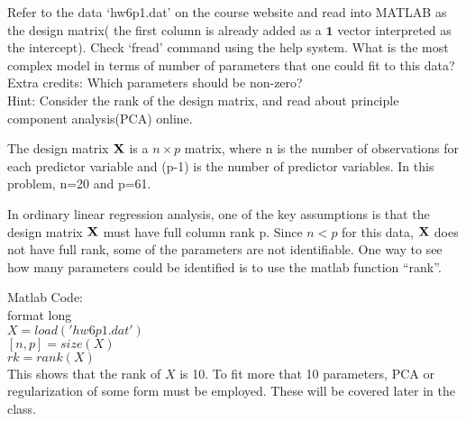 \documentclass[12pt]{article}
\begin{document}
 {
 Refer to the data `hw6p1.dat' on the course website and
 read into MATLAB as the design matrix( the first column is already added as a $\textbf{1}$ vector interpreted as the intercept). Check `fread' command using the help system. What is the most complex model in terms of number of parameters
 that one could fit to this data?\\
 Extra credits: Which parameters should be non-zero? \\
 Hint: Consider the rank of the design matrix, and read about
 principle component analysis(PCA) online.
}
 { \vfill
  \answer
} {
The design matrix $\bf{X}$ is a $n\times p$ matrix, where n is the number of observations for each predictor variable and (p-1) is the number of predictor variables. In this problem, n=20 and p=61. %

In ordinary linear regression analysis, one of the key assumptions is that the design matrix $\bf{X}$ must have full column rank p. Since $n<p$ for this data, $\bf{X}$ does not have full rank, some of the parameters are not identifiable.  One way to see how many parameters could be identified is to use the matlab function ``rank''.  



Matlab Code:\\
format long\\
$X=load('hw6p1.dat')$\\
$[n,p]=size(X)$\\
$rk=rank(X)$\\

This shows that the rank of $X$ is 10.  To fit more that 10 parameters, PCA or regularization of some form must be employed.  These will be covered later in the class.



}
\end{document}
